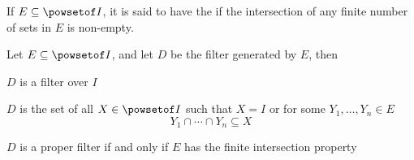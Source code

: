 \documentclass[10pt]{article}
\begin{document}
\begin{defn*}

    If $E\subseteq\powsetof I$, it is said to have the  if the intersection of any finite number of sets in $E$ is non-empty.

\end{defn*}

\begin{prop*}

    Let $E\subseteq\powsetof I$, and let $D$ be the filter generated by $E$, then
    \benum
        \item $D$ is a filter over $I$
        \item $D$ is the set of all $X\in\powsetof I$ such that $X=I$ or for some $Y_1,\dots,Y_n\in E$
        \[ Y_1\cap\cdots\cap Y_n\subseteq X \]
        \item $D$ is a proper filter if and only if $E$ has the finite intersection property
    \eenum

\end{prop*}
\end{document}
